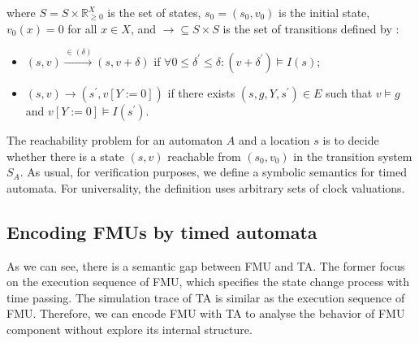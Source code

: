 where $S = S \times \mathbb{R}_{\geqslant{0}}^X$ is the set of states, $s_{0} = (s_{0},v_{0})$ is the initial state, $v_{0}(x) = 0$ for all $x \in X$, and $\rightarrow \subseteq S \times S$ is the set of transitions defined by :
\begin{itemize}
\item
$(s,v) \xrightarrow{\in(\delta)} (s,v+\delta)$ if $\forall0 \leqslant \delta^{\prime} \leqslant \delta : (v + \delta^{\prime}) \models I(s)$;
\item
$(s,v) \rightarrow(s^{\prime},v[Y := 0])$ if there exists $(s,g,Y,s^{\prime}) \in E$ such that $v \models g$ and $v[Y := 0 ] \models I(s^{\prime})$.
\end{itemize}
The reachability problem for an automaton $A$ and a location $s$ is to decide whether there is a state $(s,v)$ reachable from $(s_{0},v_{0})$ in the transition system $S_{A}$. As usual, for verification purposes, we define a symbolic semantics for timed automata. For universality, the definition uses arbitrary sets of clock valuations.
\subsection{Encoding FMUs by timed automata}
As we can see, there is a semantic gap between FMU and TA. The former focus on the execution sequence of FMU, which specifies the state change process with time passing. The simulation trace of TA is similar as the execution sequence of FMU. Therefore, we can encode FMU with TA to analyse the behavior of FMU component without explore its internal structure.

